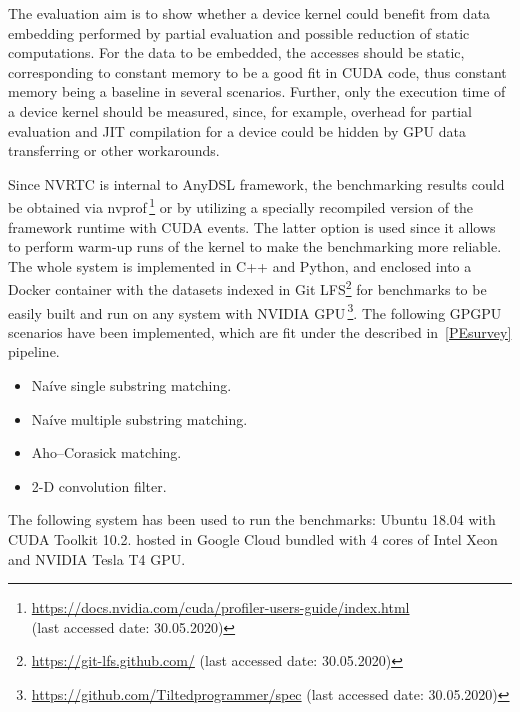 The evaluation aim is to show whether a device kernel could benefit from data embedding performed by partial evaluation and possible reduction of static computations. For the data to be embedded, the accesses should be static, corresponding to constant memory to be a good fit in CUDA code, thus constant memory being a baseline in several scenarios. Further, only the execution time of a device kernel should be measured, since, for example, overhead for partial evaluation and JIT compilation for a device could be hidden by GPU data transferring or other workarounds.

Since NVRTC is internal to AnyDSL framework, the benchmarking results could be obtained via nvprof\,\footnote{\url{https://docs.nvidia.com/cuda/profiler-users-guide/index.html} \\ (last accessed date: 30.05.2020)} or by utilizing a specially recompiled version of the framework runtime with CUDA events. The latter option is used since it allows to perform warm-up runs of the kernel to make the benchmarking more reliable. The whole system is implemented in C++ and Python, and enclosed into a Docker container with the datasets indexed in Git LFS\footnote{\url{https://git-lfs.github.com/} (last accessed date: 30.05.2020)} for benchmarks to be easily built and run on any system with NVIDIA GPU\,\footnote{\url{https://github.com/Tiltedprogrammer/spec} (last accessed date: 30.05.2020)}. The following GPGPU scenarios have been implemented, which are fit under the described in~\ref{PEsurvey} pipeline.
\begin{itemize}
    \item Na\'ive single substring matching.
    \item Na\'ive multiple substring matching.
    \item Aho--Corasick matching.
    \item 2-D convolution filter.
\end{itemize}The following system has been used to run the benchmarks: Ubuntu 18.04 with CUDA Toolkit 10.2. hosted in Google Cloud bundled with 4 cores of Intel Xeon and NVIDIA Tesla T4 GPU.
